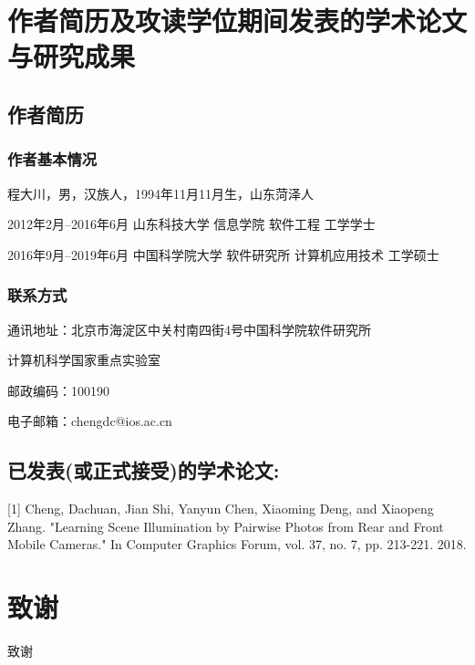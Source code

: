 \chapter{作者简历及攻读学位期间发表的学术论文与研究成果}

\section*{作者简历}

\subsection*{作者基本情况}
程大川，男，汉族人，1994年11月11月生，山东菏泽人

2012年2月--2016年6月 山东科技大学 信息学院 软件工程 工学学士

2016年9月--2019年6月 中国科学院大学 软件研究所 计算机应用技术 工学硕士

\subsection*{联系方式}
通讯地址：北京市海淀区中关村南四街4号中国科学院软件研究所

计算机科学国家重点实验室

邮政编码：100190

电子邮箱：chengdc@ios.ac.cn 

\section*{已发表(或正式接受)的学术论文:}

[1] Cheng, Dachuan, Jian Shi, Yanyun Chen, Xiaoming Deng, and Xiaopeng Zhang. "Learning Scene Illumination by Pairwise Photos from Rear and Front Mobile Cameras." In Computer Graphics Forum, vol. 37, no. 7, pp. 213-221. 2018.

\chapter[致谢]{致\quad 谢}%
\thispagestyle{noheaderstyle}%

致谢
\cleardoublepage[plain]%

